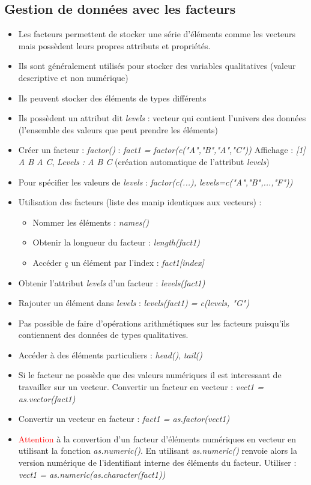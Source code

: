 \documentclass[12pt,a4paper]{article}
\begin{document}
\subsection{Gestion de données avec les facteurs}
\begin{itemize}
\item Les facteurs permettent de stocker une série d'éléments comme les vecteurs mais possèdent leurs propres attributs et propriétés.
\item Ils sont généralement utilisés pour stocker des variables qualitatives (valeur descriptive et non numérique)
\item Ils peuvent stocker des éléments de types différents
\item Ils possèdent un attribut dit \textit{levels} : vecteur qui contient l'univers des données (l'ensemble des valeurs que peut prendre les éléments)
\item Créer un facteur : \textit{factor()} :
\newline \textit{fact1 = factor(c("A","B","A","C"))}
\newline Affichage : \textit{[1] A B A C}, \textit{Levels : A B C}  (création automatique de l'attribut \textit{levels})
\item Pour spécifier les valeurs de \textit{levels} : \textit{factor(c(...), levels=c("A","B",...,"F"))}
\item Utilisation des facteurs (liste des manip identiques aux vecteurs) :
\begin{itemize}
\item Nommer les éléments : \textit{names()}
\item Obtenir la longueur du facteur : \textit{length(fact1)}
\item Accéder ç un élément par l'index : \textit{fact1[index]}
\end{itemize}
\item Obtenir l'attribut \textit{levels} d'un facteur : \textit{levels(fact1)}
\item Rajouter un élément dans \textit{levels} : \textit{levels(fact1) = c(levels, "G")}
\item Pas possible de faire d'opérations arithmétiques sur les facteurs puisqu'ils contiennent des données de types qualitatives.
\item Accéder à des éléments particuliers : \textit{head()}, \textit{tail()}
\item Si le facteur ne possède que des valeurs numériques il est interessant de travailler sur un vecteur. 
\newline Convertir un facteur en vecteur : \textit{vect1 = as.vector(fact1)}
\item Convertir un vecteur en facteur : \textit{fact1 = as.factor(vect1)}
\item \textcolor{red}{Attention } à la convertion d'un facteur d'éléments numériques en vecteur en utilisant la fonction \textit{as.numeric()}.
\newline En utilisant \textit{as.numeric()} renvoie alors la version numérique de l'identifiant interne des éléments du facteur.
\newline Utiliser : \textit{vect1 = as.numeric(as.character(fact1))}
\end{itemize}
\end{document}
